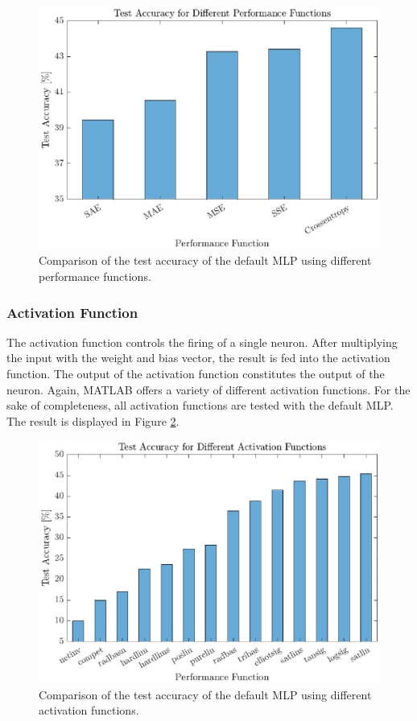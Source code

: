  \begin{figure}[h!]
 	\centering
 	\includegraphics{images/performFct}
 	\caption{Comparison of the test accuracy of the default MLP using different performance functions.}
 	\label{fig:performFct}
 \end{figure}

 \subsubsection{Activation Function}
 
 The activation function controls the firing of a single neuron. After multiplying the input with the weight and bias vector, the result is fed into the activation function. The output of the activation function constitutes the output of the neuron. Again, MATLAB offers a variety of different activation functions. For the sake of completeness, all activation functions are tested with the default MLP. The result is displayed in Figure \ref{fig:activationFct}.
 
 \begin{figure}[h!]
 	\centering
 	\includegraphics{images/activationFct}
 	\caption{Comparison of the test accuracy of the default MLP using different activation functions.}
 	\label{fig:activationFct}
 \end{figure}
 
